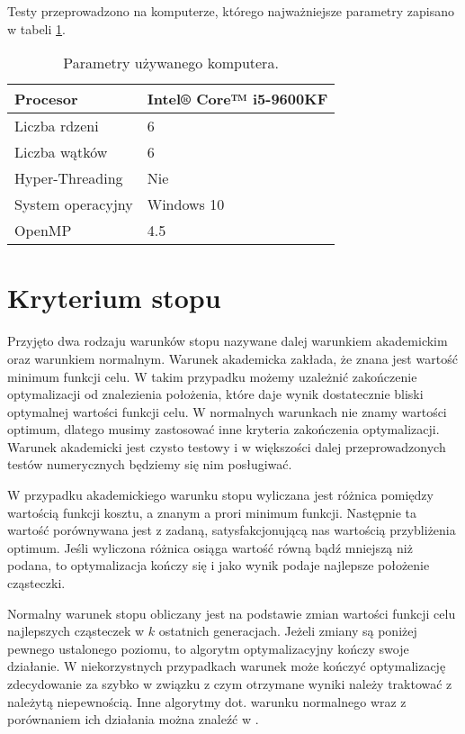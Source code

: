 \documentclass[11pt, a4paper, oneside]{article}
\begin{document}
Testy przeprowadzono na komputerze, którego najważniejsze parametry zapisano w tabeli \ref{tab:parametry}.

\begin{table}[h]
\begin{tabular}{|l|l|}
\hline
Procesor          & Intel® Core™ i5-9600KF \\ \hline
Liczba rdzeni     & 6                              \\ \hline
Liczba wątków     & 6                              \\ \hline
Hyper-Threading   & Nie                                 \\ \hline
System operacyjny & Windows 10       \\ \hline
OpenMP			  & 4.5							        \\ \hline
\end{tabular}
\caption{Parametry używanego komputera.}
\label{tab:parametry}
\end{table}

\section{Kryterium stopu} \label{sec:stop}

Przyjęto dwa rodzaju warunków stopu nazywane dalej warunkiem akademickim oraz warunkiem normalnym. Warunek akademicka zakłada, że znana jest wartość minimum funkcji celu. W takim przypadku możemy uzależnić zakończenie optymalizacji od znalezienia położenia, które daje wynik dostatecznie bliski optymalnej wartości funkcji celu. W normalnych warunkach nie znamy wartości optimum, dlatego musimy zastosować inne kryteria zakończenia optymalizacji. Warunek akademicki jest czysto testowy i w większości dalej przeprowadzonych testów numerycznych będziemy się nim posługiwać.

W przypadku akademickiego warunku stopu wyliczana jest różnica pomiędzy wartością funkcji kosztu, a znanym a prori minimum funkcji. Następnie ta wartość porównywana jest z zadaną, satysfakcjonującą nas wartością przybliżenia optimum. Jeśli wyliczona różnica osiąga wartość równą bądź mniejszą niż podana, to optymalizacja kończy się i jako wynik podaje najlepsze położenie cząsteczki.

Normalny warunek stopu obliczany jest na podstawie zmian wartości funkcji celu najlepszych cząsteczek w $k$ ostatnich generacjach. Jeżeli zmiany są poniżej pewnego ustalonego poziomu, to algorytm optymalizacyjny kończy swoje działanie. W niekorzystnych przypadkach warunek może kończyć optymalizację zdecydowanie za szybko w związku z czym otrzymane wyniki należy traktować z należytą niepewnością. Inne algorytmy dot. warunku normalnego wraz z porównaniem ich działania można znaleźć w \cite{karinZielinski}.
\end{document}
